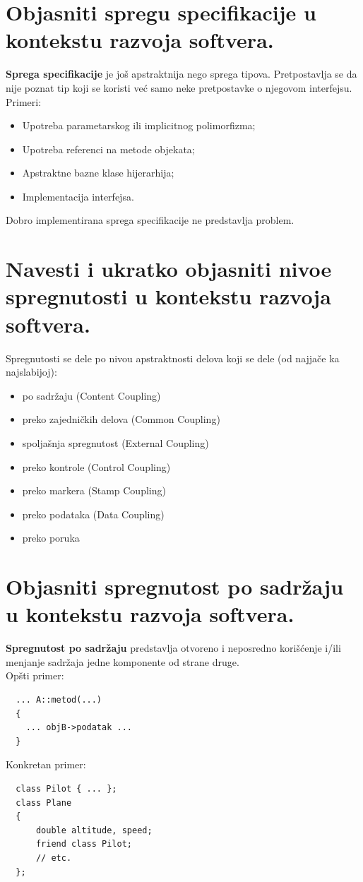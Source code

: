 \documentclass[a4paper]{article}
\begin{document}
\section{Objasniti spregu specifikacije u kontekstu razvoja softvera.}
  \textbf{Sprega specifikacije} je još apstraktnija nego sprega tipova. Pretpostavlja se 
  da nije poznat tip koji se koristi već samo neke pretpostavke o njegovom interfejsu. Primeri:
  \begin{itemize}
    \item Upotreba parametarskog ili implicitnog polimorfizma;
    \item Upotreba referenci na metode objekata;
    \item Apstraktne bazne klase hijerarhija;
    \item Implementacija interfejsa.
  \end{itemize}
  Dobro implementirana sprega specifikacije ne predstavlja problem.

\section{Navesti i ukratko objasniti nivoe spregnutosti u kontekstu razvoja softvera.}
  Spregnutosti se dele po nivou apstraktnosti delova koji se dele (od najjače ka najslabijoj):
  \cite{gfg_coupling_and_cohesion}
  \begin{itemize}
    \item po sadržaju (Content Coupling)
    \item preko zajedničkih delova (Common Coupling)
    \item spoljašnja spregnutost (External Coupling)
    \item preko kontrole (Control Coupling)
    \item preko markera (Stamp Coupling)
    \item preko podataka (Data Coupling)
    \item preko poruka 
  \end{itemize}
  
\section{Objasniti spregnutost po sadržaju u kontekstu razvoja softvera.}
  \textbf{Spregnutost po sadržaju} predstavlja otvoreno i neposredno korišćenje
  i/ili menjanje sadržaja jedne komponente od strane druge. \\
  Opšti primer:
\begin{lstlisting}
  ... A::metod(...)
  {
    ... objB->podatak ...
  }\end{lstlisting}
Konkretan primer:
\begin{lstlisting}
  class Pilot { ... };
  class Plane
  {
      double altitude, speed;
      friend class Pilot;
      // etc.
  };\end{lstlisting}
\end{document}
